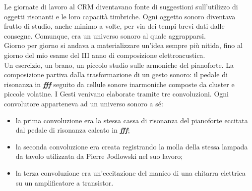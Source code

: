 Le giornate di lavoro al CRM diventavano fonte di suggestioni sull'utilizzo di oggetti risonanti e le loro capacità timbriche. Ogni oggetto sonoro diventava frutto di studio, anche minimo a volte, per via dei tempi brevi dati dalle consegne. Comunque, era un universo sonoro al quale aggrapparsi. \\
Giorno per giorno si andava a materializzare un'idea sempre più nitida, fino al giorno del mio esame del III anno di composizione elettroacustica. \\
Un esercizio, un brano, un piccolo studio sulle armoniche del pianoforte. La composizione partiva dalla trasformazione di un gesto sonoro: il pedale di risonanza in \textit{\textbf{fff}} seguito da cellule sonore inarmoniche composte da cluster e piccole volatine. I Gesti venivano elaborate tramite tre convoluzioni. Ogni convolutore apparteneva ad un universo sonoro a sé:
\begin{itemize}
\item{la prima convoluzione era la stessa cassa di risonanza del pianoforte eccitata dal pedale di risonanza calcato in \textit{\textbf{fff}};}
\item{la seconda convoluzione era creata registrando la molla della stessa lampada da tavolo utilizzata da Pierre Jodlowski nel suo lavoro;}
\item{la terza convoluzione era un'eccitazione del manico di una chitarra elettrica su un amplificatore a transistor.}
\end{itemize}

